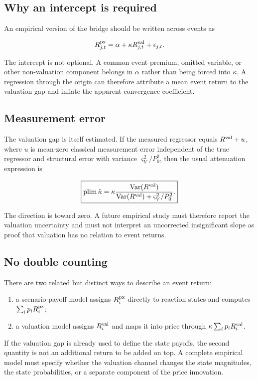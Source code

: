 \subsection{Why an intercept is required}

An empirical version of the bridge should be written across events as

\[
R^{\mathrm{px}}_{j,t}=\alpha+\kappa R^{\mathrm{val}}_{j,t}+\epsilon_{j,t}.
\]

The intercept is not optional. A common event premium, omitted variable, or
other non-valuation component belongs in $\alpha$ rather than being forced into
$\kappa$. A regression through the origin can therefore attribute a mean event
return to the valuation gap and inflate the apparent convergence coefficient.

\subsection{Measurement error}

The valuation gap is itself estimated. If the measured regressor equals
$R^{\mathrm{val}}+u$, where $u$ is mean-zero classical measurement error independent of the
true regressor and structural error with variance $\varsigma_V^2/P_0^2$, then
the usual attenuation expression is

\[
\boxed{
\operatorname{plim}\hat\kappa
=\kappa\frac{\operatorname{Var}(R^{\mathrm{val}})}
{\operatorname{Var}(R^{\mathrm{val}})+\varsigma_V^2/P_0^2}.
}
\]

The direction is toward zero. A future empirical study must therefore report
the valuation uncertainty and must not interpret an uncorrected insignificant
slope as proof that valuation has no relation to event returns.

\subsection{No double counting}

There are two related but distinct ways to describe an event return:

\begin{enumerate}
\item a scenario-payoff model assigns $R^{\mathrm{px}}_i$ directly to reaction states and
      computes $\sum_i p_iR^{\mathrm{px}}_i$;
\item a valuation model assigns $R^{\mathrm{val}}_i$ and maps it into price through
      $\kappa\sum_i p_iR^{\mathrm{val}}_i$.
\end{enumerate}

If the valuation gap is already used to define the state payoffs, the second
quantity is not an additional return to be added on top. A complete empirical
model must specify whether the valuation channel changes the state magnitudes,
the state probabilities, or a separate component of the price innovation.

